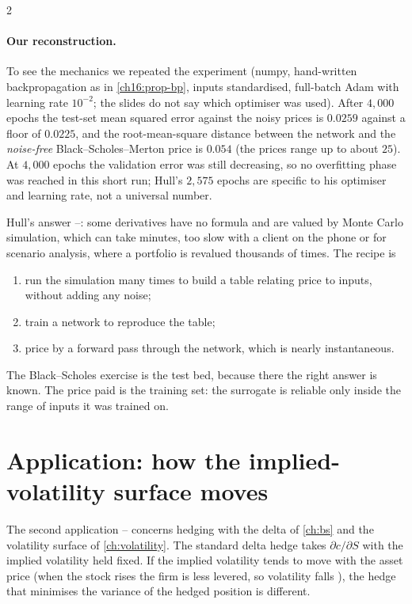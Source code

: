 \begin{paracol}{2}
\paragraph{Our reconstruction.} To see the mechanics we repeated the experiment (numpy, hand-written backpropagation as in \cref{ch16:prop-bp}, inputs standardised, full-batch Adam with learning rate $10^{-2}$; the slides do not say which optimiser
was used). After $4{,}000$ epochs the test-set mean squared error against the noisy prices is $0.0259$ against a floor of $0.0225$, and the root-mean-square distance between the network and the \emph{noise-free} Black--Scholes--Merton price is $0.054$ (the prices range up to about $25$). At $4{,}000$ epochs the validation
error was still decreasing, so no overfitting phase was reached in this short run; Hull's $2{,}575$ epochs are specific to his optimiser and learning rate, not a universal number.

\begin{finance}
Hull's answer --: some derivatives have no formula and are valued by Monte Carlo simulation, which can take minutes, too slow with a client on the phone or for scenario analysis, where a portfolio is revalued thousands of times.
The recipe is
\begin{enumerate}[1.]
  \item run the simulation many times to build a table relating price to inputs, without adding any noise;
  \item train a network to reproduce the table;
  \item price by a forward pass through the network, which is nearly instantaneous.
\end{enumerate}
The Black--Scholes exercise is the test bed, because there the right answer is known.
The price paid is the training set: the surrogate is reliable only inside the range of inputs it was trained on.
\end{finance}

\section{Application: how the implied-volatility surface moves}\label{ch16:sec-vol}
The second application -- concerns hedging with the delta of \cref{ch:bs} and the volatility surface of \cref{ch:volatility}. The standard delta hedge takes $\partial c/\partial S$ with the implied volatility held fixed. If the implied volatility tends to move with the asset price
(when the stock rises the firm is less levered, so volatility falls ), the hedge that minimises the variance of the hedged position is different.


\end{paracol}
